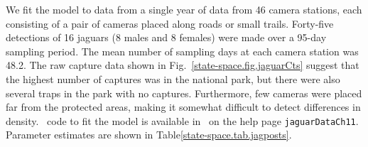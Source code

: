 We fit the model to data from a single year of data from 46
camera stations, each consisting of a pair of cameras placed along
roads or small trails. Forty-five detections of 16 jaguars (8 males and 8
females) were made over a 95-day sampling period. The mean number of
sampling days at each camera station was 48.2. The raw capture data
shown in Fig.~\ref{state-space.fig.jaguarCts} suggest that the highest
number of captures was in the national park, but there were also
several traps in the park with no captures. Furthermore, few cameras
were placed far from the protected areas, making it somewhat difficult
to detect differences in density. \R~code to fit the model is
available in \scrbook~on the help page \verb+jaguarDataCh11+.
Parameter estimates are shown in Table\ref{state-space.tab.jagposts}.




